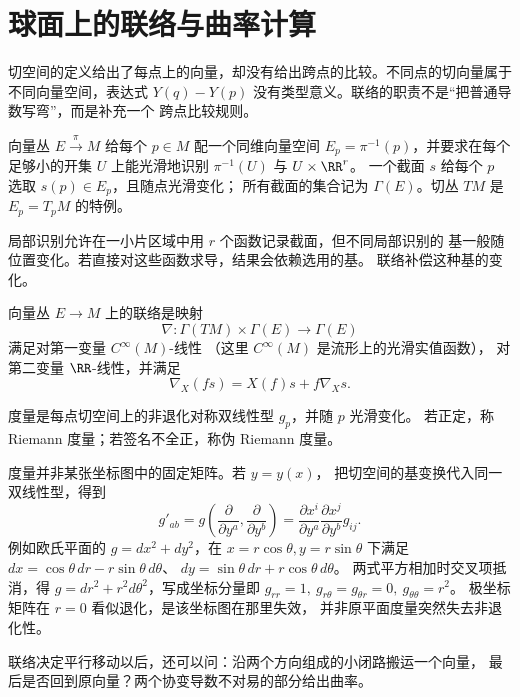 \section{球面上的联络与曲率计算}
切空间的定义给出了每点上的向量，却没有给出跨点的比较。不同点的切向量属于不同向量空间，表达式
\(Y(q)-Y(p)\) 没有类型意义。联络的职责不是“把普通导数写弯”，而是补充一个
跨点比较规则。

\begin{definition}[向量丛与截面]
向量丛 \(E\xrightarrow{\pi}M\) 给每个 \(p\in M\) 配一个同维向量空间
\(E_p=\pi^{-1}(p)\)，并要求在每个足够小的开集 \(U\) 上能光滑地识别
\(\pi^{-1}(U)\) 与 \(U\times\RR^r\)。
一个截面 \(s\) 给每个 \(p\) 选取 \(s(p)\in E_p\)，且随点光滑变化；
所有截面的集合记为 \(\Gamma(E)\)。切丛 \(TM\) 是 \(E_p=T_pM\)
的特例。
\end{definition}

局部识别允许在一小片区域中用 \(r\) 个函数记录截面，但不同局部识别的
基一般随位置变化。若直接对这些函数求导，结果会依赖选用的基。
联络补偿这种基的变化。

\begin{definition}[向量丛上的联络]
向量丛 \(E\to M\) 上的联络是映射
\[
\nabla:\Gamma(TM)\times\Gamma(E)\to\Gamma(E)
\]
满足对第一变量 \(C^\infty(M)\)-线性
（这里 \(C^\infty(M)\) 是流形上的光滑实值函数），
对第二变量 \(\RR\)-线性，并满足
\[
\nabla_X(f s)=X(f)s+f\nabla_Xs.
\]
\end{definition}

\begin{definition}[伪 Riemann 度量]
度量是每点切空间上的非退化对称双线性型 \(g_p\)，并随 \(p\) 光滑变化。
若正定，称 Riemann 度量；若签名不全正，称伪 Riemann 度量。
\end{definition}

度量并非某张坐标图中的固定矩阵。若 \(y=y(x)\)，
把切空间的基变换代入同一双线性型，得到
\[
g'_{ab}=g\!\left(\frac{\partial}{\partial y^a},
\frac{\partial}{\partial y^b}\right)
=\frac{\partial x^i}{\partial y^a}
\frac{\partial x^j}{\partial y^b}g_{ij}.
\]
例如欧氏平面的 \(g=dx^2+dy^2\)，在
\(x=r\cos\theta,y=r\sin\theta\) 下满足
\(dx=\cos\theta\,dr-r\sin\theta\,d\theta\)、
\(dy=\sin\theta\,dr+r\cos\theta\,d\theta\)。
两式平方相加时交叉项抵消，得
\(g=dr^2+r^2d\theta^2\)，写成坐标分量即
\(g_{rr}=1,\ g_{r\theta}=g_{\theta r}=0,\ g_{\theta\theta}=r^2\)。
极坐标矩阵在 \(r=0\) 看似退化，是该坐标图在那里失效，
并非原平面度量突然失去非退化性。

联络决定平行移动以后，还可以问：沿两个方向组成的小闭路搬运一个向量，
最后是否回到原向量？两个协变导数不对易的部分给出曲率。

